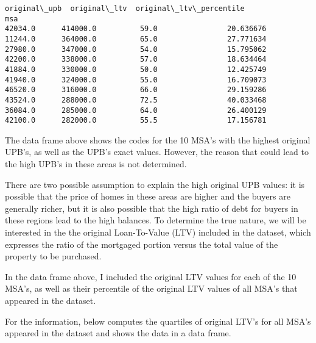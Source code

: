 \documentclass[11pt]{article}
\makeatletter
\newcommand{\boxspacing}{\kern\kvtcb@left@rule\kern\kvtcb@boxsep}
\newcommand{\prompt}[4]{
        \ttfamily\llap{{\color{#2}[#3]:\hspace{3pt}#4}}\vspace{-\baselineskip}
    }
\makeatother
\begin{document}
            \begin{tcolorbox}[breakable, size=fbox, boxrule=.5pt, pad at break*=1mm, opacityfill=0]
\prompt{Out}{outcolor}{6}{\boxspacing}
\begin{Verbatim}[commandchars=\\\{\}]
         original\_upb  original\_ltv  original\_ltv\_percentile
msa
42034.0      414000.0          59.0                20.636676
11244.0      364000.0          65.0                27.771634
27980.0      347000.0          54.0                15.795062
42200.0      338000.0          57.0                18.634464
41884.0      330000.0          50.0                12.425749
41940.0      324000.0          55.0                16.709073
46520.0      316000.0          66.0                29.159286
43524.0      288000.0          72.5                40.033468
36084.0      285000.0          64.0                26.400129
42100.0      282000.0          55.5                17.156781
\end{Verbatim}
\end{tcolorbox}
        
    The data frame above shows the codes for the 10 MSA's with the highest
original UPB's, as well as the UPB's exact values. However, the reason
that could lead to the high UPB's in these areas is not determined.

There are two possible assumption to explain the high original UPB
values: it is possible that the price of homes in these areas are higher
and the buyers are generally richer, but it is also possible that the
high ratio of debt for buyers in these regions lead to the high
balances. To determine the true nature, we will be interested in the the
original Loan-To-Value (LTV) included in the dataset, which expresses
the ratio of the mortgaged portion versus the total value of the
property to be purchased.

In the data frame above, I included the original LTV values for each of
the 10 MSA's, as well as their percentile of the original LTV values of
all MSA's that appeared in the dataset.

For the information, below computes the quartiles of original LTV's for
all MSA's appeared in the dataset and shows the data in a data frame.
\end{document}
